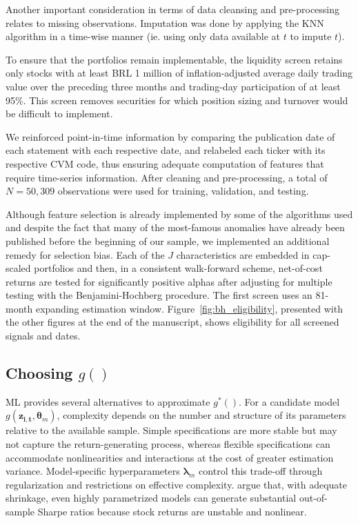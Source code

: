 \documentclass[preprint,12pt,authoryear]{elsarticle}
\begin{document}
Another important consideration in terms of data cleansing and pre-processing relates to missing observations. Imputation was done by applying the KNN algorithm in a time-wise manner (ie. using only data available at $t$ to impute $t$).

To ensure that the portfolios remain implementable, the liquidity screen retains only stocks with at least BRL 1 million of inflation-adjusted average daily trading value over the preceding three months and trading-day participation of at least 95\%. This screen removes securities for which position sizing and turnover would be difficult to implement.
   
We reinforced point-in-time information by comparing the publication date of each statement with each respective date, and relabeled each ticker with its respective CVM code, thus ensuring adequate computation of features that require time-series information. After cleaning and pre-processing, a total of $N = 50,309$ observations were used for training, validation, and testing.

Although feature selection is already implemented by some of the algorithms used and despite the fact that many of the most-famous anomalies have already been published before the beginning of our sample, we implemented an additional remedy for selection bias. Each of the $J$ characteristics are embedded in cap-scaled portfolios and then, in a consistent walk-forward scheme, net-of-cost returns are tested for significantly positive alphas after adjusting for multiple testing with the Benjamini-Hochberg procedure. The first screen uses an 81-month expanding estimation window. Figure~\ref{fig:bh_eligibility}, presented with the other figures at the end of the manuscript, shows eligibility for all screened signals and dates.

\subsection{Choosing $g()$}
ML provides several alternatives to approximate $g^{*}()$. For a candidate model $g(\mathbf{z_{i,t}},\mathbf{\theta}_{m})$, complexity depends on the number and structure of its parameters relative to the available sample. Simple specifications are more stable but may not capture the return-generating process, whereas flexible specifications can accommodate nonlinearities and interactions at the cost of greater estimation variance. Model-specific hyperparameters $\mathbf{\lambda}_{m}$ control this trade-off through regularization and restrictions on effective complexity. \citet{kellymalamudzhou2022} argue that, with adequate shrinkage, even highly parametrized models can generate substantial out-of-sample Sharpe ratios because stock returns are unstable and nonlinear.
\end{document}
